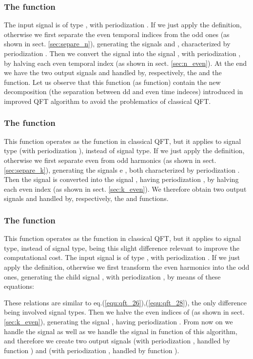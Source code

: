 \documentclass[a4paper,10pt]{article}
\begin{document}
\subsubsection{The  function}

The input signal is of type , with periodization .
If  we just apply the  definition, otherwise we first separate the even temporal indices from the odd ones (as shown in sect. \ref{sec:separe_n}), generating the signals  and , characterized by periodization .
Then we convert the signal  into the signal , with periodization , by halving each even temporal index  (as shown in sect. \ref{sec:n_even}). 
At the end we have the two output signals  and  handled by, respectively, the  and the  function.
Let us observe that this function (as  function) contain the new decomposition (the separation between dd and even time indeces) introduced in improved QFT algorithm to avoid the problematics of classical QFT.


\subsubsection{The  function}

This function operates as the  function in classical QFT, but it applies to  signal type (with periodization ), instead of    signal type.
If   we just apply the  definition, otherwise we first separate even from odd harmonics (as shown in sect. \ref{sec:separe_k}), generating the signals  e , both characterized by periodization .
Then the signal  is converted into the signal , having periodization , by halving each even index  (as shown in sect. \ref{sec:k_even}). 
We therefore obtain two output signals  and  handled by, respectively, the  and  functions.



\subsubsection{The  function}

This function operates as the  function in classical QFT, but it applies to  signal type, instead of  signal type, being this slight difference relevant to improve the  computational cost. 
The input signal is of type , with periodization .
If  we just apply the  definition, otherwise we first transform the even harmonics into the odd ones, generating the child signal , with periodization , by means of these equations:



These relations are similar to eq.(\ref{equ:qft_26}),(\ref{equ:qft_28}), the only difference being involved signal types. 
Then we halve the even  indices of  (as shown in sect. \ref{sec:k_even}), generating the signal  , having periodization .
From now on we handle the signal   as well as we handle the signal  in function  of this algorithm, and therefore we create two output signals  (with periodization , handled by function ) and  (with periodization , handled by function ).
\end{document}
